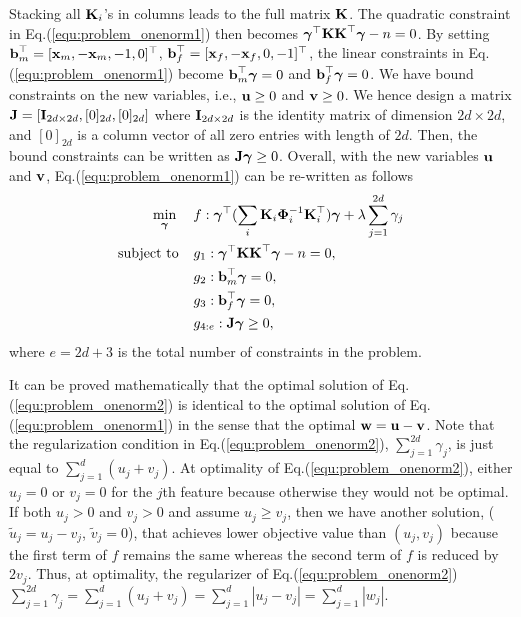 \documentclass[10pt,letterpaper]{article}
\newcommand{\matrx}[1]{\ensuremath\boldsymbol{\rm #1}}
\newcommand{\vect}[1]{\ensuremath\boldsymbol{\rm #1}}
\begin{document}
Stacking all $\matrx K_i$'s in columns leads to the full matrix $\matrx K$. The quadratic constraint in Eq.(\ref{equ:problem_onenorm1}) then becomes $\vect \gamma^\top \matrx K \matrx K^\top \vect \gamma - n =0$. By setting $
\vect b_m^\top=[\vect x_m, - \vect x_m, -1, 0]^\top$, $\vect b_f^\top =[\vect x_f, - \vect x_f, 0, -1]^\top$, the linear constraints in Eq.(\ref{equ:problem_onenorm1}) become $\vect b_m^\top \vect \gamma = 0$ and $\vect b_f^\top \vect \gamma = 0$. 
We have bound constraints on the new variables, i.e., $\vect u \ge 0$ and $\vect v \ge 0$. We hence design a matrix $\matrx J = [\matrx I_{2d\times 2d}, [0]_{2d}, [0]_{2d}] $ where $\matrx I_{2d \times 2d}$ is the identity matrix of dimension $2d \times 2d$, and $[0]_{2d}$ is a column vector of all zero entries with length of $2d$. Then, the bound constraints can be written as $\matrx J \vect \gamma \ge 0$.
Overall, with the new variables $\vect u$ and $\vect v$, Eq.(\ref{equ:problem_onenorm1}) can be re-written as follows
\begin{equation}
\label{equ:problem_onenorm2}
\begin{split}
\min_{\vect \gamma} \phantom{aa} & f: \vect \gamma^\top (\sum_i \matrx K_i \matrx \Phi_i^{-1} \matrx K_i^\top) \vect \gamma + \lambda \sum_{j=1}^{2d}\gamma_j \\
\mbox{subject to} \phantom{aa} & g_1: \vect \gamma^\top \matrx K \matrx K^\top \vect \gamma - n = 0,  \\
                               & g_2: \vect b_m^\top \vect \gamma = 0,   \\
                               & g_3: \vect b_f^\top \vect \gamma = 0, \\
                               & g_{4:e}:\matrx J \vect \gamma \ge 0,
\end{split}
\end{equation}
where $e=2d+3$ is the total number of constraints in the problem. 

It can be proved mathematically that the optimal solution of Eq.(\ref{equ:problem_onenorm2}) is identical to the optimal solution of Eq.(\ref{equ:problem_onenorm1}) in the sense that the optimal $\vect w = \vect u - \vect v$. Note that the regularization condition in Eq.(\ref{equ:problem_onenorm2}), $\sum_{j=1}^{2d} \gamma_j$, is just equal to $\sum_{j=1}^d (u_j + v_j)$. At optimality of Eq.(\ref{equ:problem_onenorm2}), either $u_j=0$ or $v_j=0$ for the $j$th feature because otherwise they would not be optimal. If both $u_j>0$ and $v_j>0$ and assume $u_j \ge v_j$, then we have another solution, ($\tilde{u}_j = u_j -v_j$, $\tilde{v}_j=0$), that achieves lower objective value than $(u_j,v_j)$ because the first term of $f$ remains the same whereas the second term of $f$ is reduced by $2 v_j$. Thus, at optimality, the regularizer of Eq.(\ref{equ:problem_onenorm2}) $\sum_{j=1}^{2d} \gamma_j = \sum_{j=1}^d (u_j + v_j) = \sum_{j=1}^d |u_j - v_j| = \sum_{j=1}^d |w_j|$.
\end{document}
